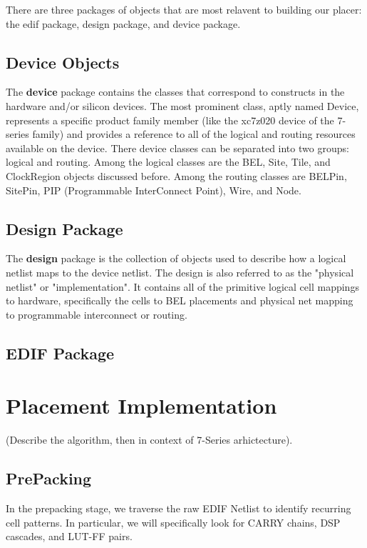 \documentclass[twocolumn]{article}
\begin{document}
    There are three packages of objects that are most relavent to building our placer: the edif package, design package, and device package.

    \subsection{Device Objects}
    The \textbf{device} package contains the classes that correspond to constructs in the hardware and/or silicon devices. 
    The most prominent class, aptly named Device, represents a specific product family member (like the xc7z020 device of the 7-series family) and provides a reference to all of the logical and routing resources available on the device.
    There device classes can be separated into two groups: logical and routing.
    Among the logical classes are the BEL, Site, Tile, and ClockRegion objects discussed before.
    Among the routing classes are BELPin, SitePin, PIP (Programmable InterConnect Point), Wire, and Node.


    \subsection{Design Package}
    The \textbf{design} package is the collection of objects used to describe how a logical netlist maps to the device netlist. 
    The design is also referred to as the "physical netlist" or "implementation".
    It contains all of the primitive logical cell mappings to hardware, specifically the cells to BEL placements and physical net mapping to programmable interconnect or routing.

    \subsection{EDIF Package}


\section{Placement Implementation}
    (Describe the algorithm, then in context of 7-Series arhictecture). \\
    \subsection{PrePacking}
        In the prepacking stage, we traverse the raw EDIF Netlist to identify recurring cell patterns. In particular, we will specifically look for CARRY chains, DSP cascades, and LUT-FF pairs.
\end{document}
